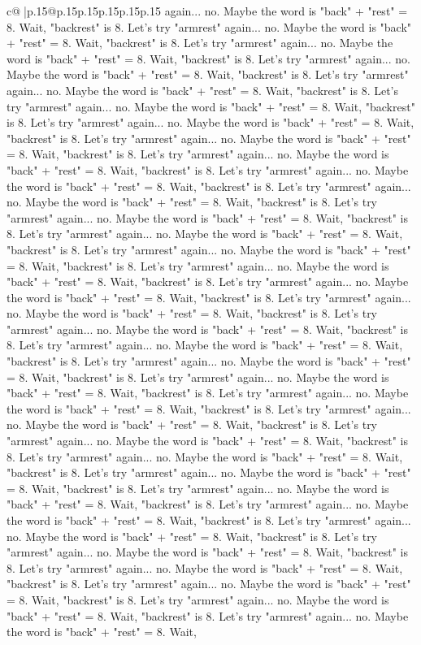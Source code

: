 \documentclass{article}
\begin{document}
{\begin{supertabular}{c@{$\;$}|p{.15\linewidth}@{}p{.15\linewidth}p{.15\linewidth}p{.15\linewidth}p{.15\linewidth}p{.15\linewidth}}
{{{again... no. Maybe the word is "back" + "rest" = 8. Wait, "backrest" is 8. Let's try "armrest" again... no. Maybe the word is "back" + "rest" = 8. Wait, "backrest" is 8. Let's try "armrest" again... no. Maybe the word is "back" + "rest" = 8. Wait, "backrest" is 8. Let's try "armrest" again... no. Maybe the word is "back" + "rest" = 8. Wait, "backrest" is 8. Let's try "armrest" again... no. Maybe the word is "back" + "rest" = 8. Wait, "backrest" is 8. Let's try "armrest" again... no. Maybe the word is "back" + "rest" = 8. Wait, "backrest" is 8. Let's try "armrest" again... no. Maybe the word is "back" + "rest" = 8. Wait, "backrest" is 8. Let's try "armrest" again... no. Maybe the word is "back" + "rest" = 8. Wait, "backrest" is 8. Let's try "armrest" again... no. Maybe the word is "back" + "rest" = 8. Wait, "backrest" is 8. Let's try "armrest" again... no. Maybe the word is "back" + "rest" = 8. Wait, "backrest" is 8. Let's try "armrest" again... no. Maybe the word is "back" + "rest" = 8. Wait, "backrest" is 8. Let's try "armrest" again... no. Maybe the word is "back" + "rest" = 8. Wait, "backrest" is 8. Let's try "armrest" again... no. Maybe the word is "back" + "rest" = 8. Wait, "backrest" is 8. Let's try "armrest" again... no. Maybe the word is "back" + "rest" = 8. Wait, "backrest" is 8. Let's try "armrest" again... no. Maybe the word is "back" + "rest" = 8. Wait, "backrest" is 8. Let's try "armrest" again... no. Maybe the word is "back" + "rest" = 8. Wait, "backrest" is 8. Let's try "armrest" again... no. Maybe the word is "back" + "rest" = 8. Wait, "backrest" is 8. Let's try "armrest" again... no. Maybe the word is "back" + "rest" = 8. Wait, "backrest" is 8. Let's try "armrest" again... no. Maybe the word is "back" + "rest" = 8. Wait, "backrest" is 8. Let's try "armrest" again... no. Maybe the word is "back" + "rest" = 8. Wait, "backrest" is 8. Let's try "armrest" again... no. Maybe the word is "back" + "rest" = 8. Wait, "backrest" is 8. Let's try "armrest" again... no. Maybe the word is "back" + "rest" = 8. Wait, "backrest" is 8. Let's try "armrest" again... no. Maybe the word is "back" + "rest" = 8. Wait, "backrest" is 8. Let's try "armrest" again... no. Maybe the word is "back" + "rest" = 8. Wait, "backrest" is 8. Let's try "armrest" again... no. Maybe the word is "back" + "rest" = 8. Wait, "backrest" is 8. Let's try "armrest" again... no. Maybe the word is "back" + "rest" = 8. Wait, "backrest" is 8. Let's try "armrest" again... no. Maybe the word is "back" + "rest" = 8. Wait, "backrest" is 8. Let's try "armrest" again... no. Maybe the word is "back" + "rest" = 8. Wait, "backrest" is 8. Let's try "armrest" again... no. Maybe the word is "back" + "rest" = 8. Wait, "backrest" is 8. Let's try "armrest" again... no. Maybe the word is "back" + "rest" = 8. Wait, "backrest" is 8. Let's try "armrest" again... no. Maybe the word is "back" + "rest" = 8. Wait, "backrest" is 8. Let's try "armrest" again... no. Maybe the word is "back" + "rest" = 8. Wait, "backrest" is 8. Let's try "armrest" again... no. Maybe the word is "back" + "rest" = 8. Wait, "backrest" is 8. Let's try "armrest" again... no. Maybe the word is "back" + "rest" = 8. Wait, }}}
\end{supertabular}}
\end{document}
